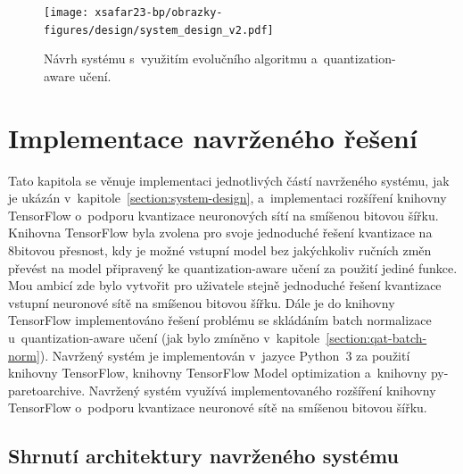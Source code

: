 \begin{figure}[H]
	\centering
	\texttt{[image: xsafar23-bp/obrazky-figures/design/system\_design\_v2.pdf]}
	\caption{Návrh systému s~využitím evolučního algoritmu a~quantization-aware učení.}
	\label{fig:system-design} 
\end{figure}


\chapter{Implementace navrženého řešení}
\label{chapter:implementation}

Tato kapitola se věnuje implementaci jednotlivých částí navrženého systému, jak je ukázán v~kapitole~\ref{section:system-design}, a~implementaci rozšíření knihovny TensorFlow o~podporu kvantizace neuronových sítí na smíšenou bitovou šířku. Knihovna TensorFlow byla zvolena pro svoje jednoduché řešení kvantizace na 8bitovou přesnost, kdy je možné vstupní model bez jakýchkoliv ručních změn převést na model připravený ke quantization-aware učení za použití jediné funkce. Mou ambicí zde bylo vytvořit pro uživatele stejně jednoduché řešení kvantizace vstupní neuronové sítě na smíšenou bitovou šířku. Dále je do knihovny TensorFlow implementováno řešení problému se skládáním batch normalizace u~quantization-aware učení (jak bylo zmíněno v~kapitole~\ref{section:qat-batch-norm}). Navržený systém je implementován v~jazyce Python~3 za použití knihovny TensorFlow, knihovny TensorFlow Model optimization a~knihovny py-paretoarchive. Navržený systém využívá implementovaného rozšíření knihovny TensorFlow o~podporu kvantizace neuronové sítě na smíšenou bitovou šířku.

\section{Shrnutí architektury navrženého systému}
\label{section:architecture_overview}

